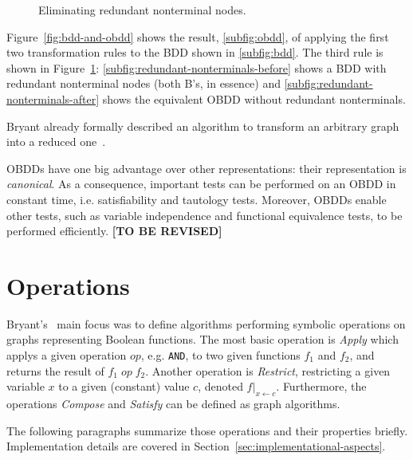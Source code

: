 \documentclass{vldb}
\newcommand{\tbr}{\textbf{[TO BE REVISED]}}
\begin{document}
\begin{figure}[ht]
    \centering
    \subfigure[]{
        
        \label{subfig:redundant-nonterminals-before}
    }
    \hskip1cm
    \subfigure[]{
        
        \label{subfig:redundant-nonterminals-after}
    }
    \caption{Eliminating redundant nonterminal nodes.}
    \label{fig:redundant-nonterminals}
\end{figure}

Figure~\ref{fig:bdd-and-obdd} shows the result, \ref{subfig:obdd}, of applying
the first two transformation rules to the BDD shown in \ref{subfig:bdd}.
The third rule is shown in Figure~\ref{fig:redundant-nonterminals}:
\ref{subfig:redundant-nonterminals-before} shows a BDD with redundant
nonterminal nodes (both B's, in essence) and
\ref{subfig:redundant-nonterminals-after} shows the equivalent OBDD without
redundant nonterminals.

Bryant already formally described an algorithm to transform an arbitrary graph
into a reduced one~\cite[p. 683]{BRYANT86}. 

OBDDs have one big advantage over other representations: their representation is
\textit{canonical}. As a consequence, important tests can be performed on an OBDD
in constant time, i.e. satisfiability and tautology tests. Moreover, OBDDs enable
other tests, such as variable independence and functional equivalence tests, to
be performed efficiently. \tbr

\section{Operations}
\label{sec:operations}

Bryant's~\cite{BRYANT86, BRYANT92} main focus was to define algorithms performing
symbolic operations on graphs representing Boolean functions. The most basic
operation is \textit{Apply} which applys a given operation $op$, e.g. \texttt{AND},
to two given functions $f_1$ and $f_2$, and returns the result of $f_1\;op\;f_2$.
Another operation is \textit{Restrict}, restricting a given variable $x$ to a
given (constant) value $c$, denoted $f|_{x\leftarrow c}$. Furthermore, the
operations \textit{Compose} and \textit{Satisfy} can be defined as graph
algorithms.

The following paragraphs summarize those operations and their properties briefly.
Implementation details are covered in Section~\ref{sec:implementational-aspects}.
\end{document}
